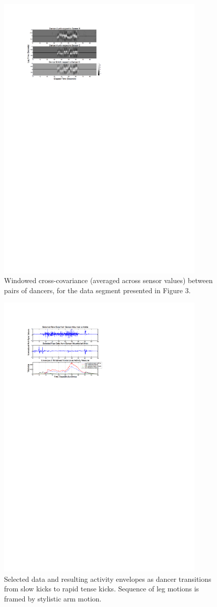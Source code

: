 \begin{figure}[t]
\centering
\includegraphics[width=100mm]{jp_fig4} 
\caption{Windowed cross-covariance (averaged across sensor values)
between pairs of dancers, for the data segment presented in Figure 3.}
\label{Aylward:fig:4} 
\end{figure}

\begin{figure}[t]
\centering
\includegraphics[width=100mm]{jp_fig5} 
\caption{Selected data and resulting activity envelopes as dancer
transitions from slow kicks to rapid tense kicks. Sequence of leg motions is
framed by stylistic arm motion.}
\label{Aylward:fig:5} 
\end{figure}


